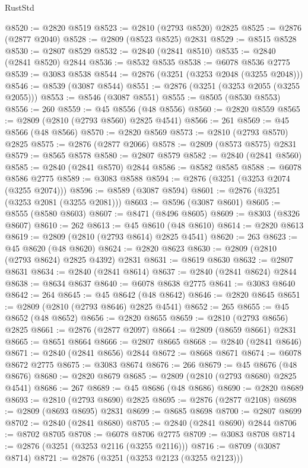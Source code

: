 \begin{lexlean}{RustStd}
\begin{coremodule}
@8520 := @2820 @8519
@8523 := @2810 (@2793 @8520) @2825
@8525 := @2876 (@2877 @2040)
@8528 := @2809 (@8523 @8525) @2831
@8529 := @8515 @8528
@8530 := @2807 @8529
@8532 := @2840 (@2841 @8510)
@8535 := @2840 (@2841 @8520) @2844
@8536 := @8532 @8535
@8538 := @6078 @8536 @2775
@8539 := @3083 @8538
@8544 := @2876 (@3251 (@3253 @2048 (@3255 @2048)))
@8546 := @8539 (@3087 @8544)
@8551 := @2876 (@3251 (@3253 @2055 (@3255 @2055)))
@8553 := @8546 (@3087 @8551)
@8555 := @8505 (@8530 @8553)
@8556 := 260
@8559 := @45 @8556 (@48 @8556)
@8560 := @2820 @8559
@8565 := @2809 (@2810 (@2793 @8560) @2825 @4541)
@8566 := 261
@8569 := @45 @8566 (@48 @8566)
@8570 := @2820 @8569
@8573 := @2810 (@2793 @8570) @2825
@8575 := @2876 (@2877 @2066)
@8578 := @2809 (@8573 @8575) @2831
@8579 := @8565 @8578
@8580 := @2807 @8579
@8582 := @2840 (@2841 @8560)
@8585 := @2840 (@2841 @8570) @2844
@8586 := @8582 @8585
@8588 := @6078 @8586 @2775
@8589 := @3083 @8588
@8594 := @2876 (@3251 (@3253 @2074 (@3255 @2074)))
@8596 := @8589 (@3087 @8594)
@8601 := @2876 (@3251 (@3253 @2081 (@3255 @2081)))
@8603 := @8596 (@3087 @8601)
@8605 := @8555 (@8580 @8603)
@8607 := @8471 (@8496 @8605)
@8609 := @8303 (@8326 @8607)
@8610 := 262
@8613 := @45 @8610 (@48 @8610)
@8614 := @2820 @8613
@8619 := @2809 (@2810 (@2793 @8614) @2825 @4541)
@8620 := 263
@8623 := @45 @8620 (@48 @8620)
@8624 := @2820 @8623
@8630 := @2809 (@2810 (@2793 @8624) @2825 @4392) @2831
@8631 := @8619 @8630
@8632 := @2807 @8631
@8634 := @2840 (@2841 @8614)
@8637 := @2840 (@2841 @8624) @2844
@8638 := @8634 @8637
@8640 := @6078 @8638 @2775
@8641 := @3083 @8640
@8642 := 264
@8645 := @45 @8642 (@48 @8642)
@8646 := @2820 @8645
@8651 := @2809 (@2810 (@2793 @8646) @2825 @4541)
@8652 := 265
@8655 := @45 @8652 (@48 @8652)
@8656 := @2820 @8655
@8659 := @2810 (@2793 @8656) @2825
@8661 := @2876 (@2877 @2097)
@8664 := @2809 (@8659 @8661) @2831
@8665 := @8651 @8664
@8666 := @2807 @8665
@8668 := @2840 (@2841 @8646)
@8671 := @2840 (@2841 @8656) @2844
@8672 := @8668 @8671
@8674 := @6078 @8672 @2775
@8675 := @3083 @8674
@8676 := 266
@8679 := @45 @8676 (@48 @8676)
@8680 := @2820 @8679
@8685 := @2809 (@2810 (@2793 @8680) @2825 @4541)
@8686 := 267
@8689 := @45 @8686 (@48 @8686)
@8690 := @2820 @8689
@8693 := @2810 (@2793 @8690) @2825
@8695 := @2876 (@2877 @2108)
@8698 := @2809 (@8693 @8695) @2831
@8699 := @8685 @8698
@8700 := @2807 @8699
@8702 := @2840 (@2841 @8680)
@8705 := @2840 (@2841 @8690) @2844
@8706 := @8702 @8705
@8708 := @6078 @8706 @2775
@8709 := @3083 @8708
@8714 := @2876 (@3251 (@3253 @2116 (@3255 @2116)))
@8716 := @8709 (@3087 @8714)
@8721 := @2876 (@3251 (@3253 @2123 (@3255 @2123)))

\end{coremodule}
\end{lexlean}
